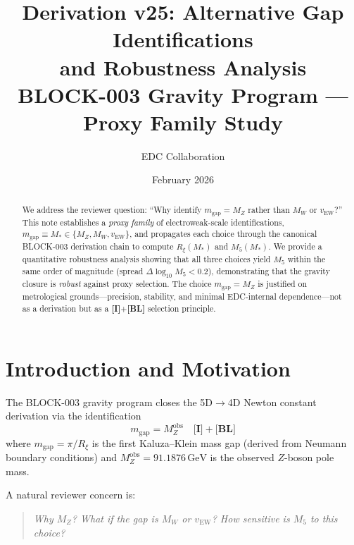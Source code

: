 \documentclass[11pt,a4paper]{article}
\newcommand{\Mfive}{M_5}
\newcommand{\Rxi}{R_\xi}
\newcommand{\mgap}{m_{\mathrm{gap}}}
\newcommand{\MZ}{M_Z}
\newcommand{\MW}{M_W}
\newcommand{\vEW}{v_{\mathrm{EW}}}
\newcommand{\Mstar}{M_*}
\newcommand{\GeV}{\,\mathrm{GeV}}
\newcommand{\tagI}{\textbf{[I]}}
\newcommand{\tagBL}{\textbf{[BL]}}
\theoremstyle{definition}
\theoremstyle{plain}
\theoremstyle{remark}
\begin{document}
\title{\textbf{Derivation v25: Alternative Gap Identifications\\and Robustness Analysis}\\[0.5em]
\large BLOCK-003 Gravity Program --- Proxy Family Study}
\author{EDC Collaboration}
\date{February 2026}
\maketitle

\begin{abstract}
We address the reviewer question: ``Why identify $\mgap = \MZ$ rather than $\MW$ or $\vEW$?''
This note establishes a \emph{proxy family} of electroweak-scale identifications,
$\mgap \equiv \Mstar \in \{\MZ, \MW, \vEW\}$, and propagates each choice through
the canonical BLOCK-003 derivation chain to compute $\Rxi(\Mstar)$ and $\Mfive(\Mstar)$.
We provide a quantitative robustness analysis showing that all three choices yield
$\Mfive$ within the same order of magnitude (spread $\Delta\log_{10}\Mfive < 0.2$),
demonstrating that the gravity closure is \emph{robust} against proxy selection.
The choice $\mgap = \MZ$ is justified on metrological grounds---precision, stability,
and minimal EDC-internal dependence---not as a derivation but as a \tagI{}+\tagBL{} selection principle.
\end{abstract}

\tableofcontents
\newpage

\section{Introduction and Motivation}
\label{sec:intro}

The BLOCK-003 gravity program closes the 5D$\to$4D Newton constant derivation
via the identification
\begin{equation}
\mgap = \MZ^{\mathrm{obs}} \quad \tagI{}+\tagBL{}
\label{eq:canonical-id}
\end{equation}
where $\mgap = \pi/\Rxi$ is the first Kaluza--Klein mass gap (derived from Neumann
boundary conditions) and $\MZ^{\mathrm{obs}} = 91.1876\GeV$ is the observed $Z$-boson
pole mass.

A natural reviewer concern is:

\begin{quote}
\emph{Why $\MZ$? What if the gap is $\MW$ or $\vEW$? How sensitive is $\Mfive$ to this choice?}
\end{quote}
\end{document}
